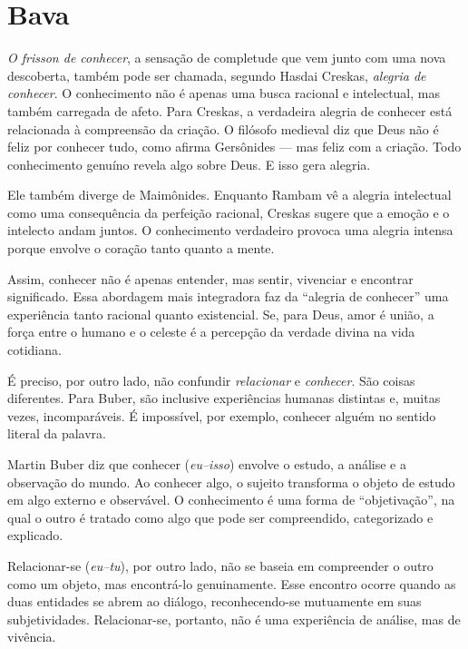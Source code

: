 
\chapter*{Bava \smallskip{}}

\textit{O \emph{frisson} de conhecer}, a sensação de completude que vem junto com uma nova descoberta, também pode ser chamada, segundo Hasdai Creskas, \textit{alegria de conhecer}. O conhecimento não é apenas uma busca racional e intelectual, mas também carregada de afeto. Para Creskas, a verdadeira alegria de conhecer está relacionada à compreensão da criação. O filósofo medieval diz que Deus não é feliz por conhecer tudo, como afirma Gersônides --- mas feliz com a criação. Todo conhecimento genuíno revela algo sobre Deus. E isso gera alegria. 

Ele também diverge de Maimônides. Enquanto Rambam vê a alegria intelectual como uma consequência da perfeição racional, Creskas sugere que a emoção e o intelecto andam juntos. O conhecimento verdadeiro provoca uma alegria intensa porque envolve o coração tanto quanto a mente.

Assim, conhecer não é apenas entender, mas sentir, vivenciar e encontrar significado. Essa abordagem mais integradora faz da “alegria de conhecer” uma experiência tanto racional quanto existencial. Se, para Deus, amor é união, a força entre o humano e o celeste é a percepção da verdade divina na vida cotidiana.

É preciso, por outro lado, não confundir \textit{relacionar} e \textit{conhecer}. São coisas diferentes. Para Buber, são inclusive experiências humanas distintas e, muitas vezes, incomparáveis. É impossível, por exemplo, conhecer alguém no sentido literal da palavra.

Martin Buber diz que conhecer (\textit{eu--isso}) envolve o estudo, a análise e a observação do mundo. Ao conhecer algo, o sujeito transforma o objeto de estudo em algo externo e observável. O conhecimento é uma forma de ``objetivação'', na qual o outro é tratado como algo que pode ser compreendido, categorizado e explicado.

Relacionar-se (\textit{eu--tu}), por outro lado, não se baseia em compreender o outro como um objeto, mas encontrá-lo genuinamente. Esse encontro ocorre quando as duas entidades se abrem ao diálogo, reconhecendo-se mutuamente em suas subjetividades. Relacionar-se, portanto, não é uma experiência de análise, mas de vivência.

